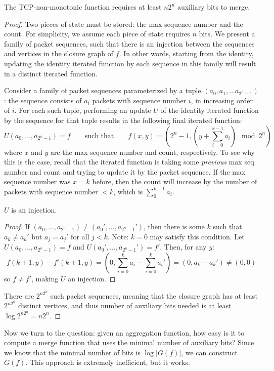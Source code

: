 \begin{theorem}
The TCP-non-monotonic function requires at least $n2^n$ auxiliary bits to merge.
\end{theorem}
\begin{proof}
Two pieces of state must be stored: the max sequence number and the count. For simplicity, we assume each piece of state requires $n$ bits.
We present a family of packet sequences, such that there is an injection between the sequences and vertices in the closure graph of $f$. In other words, starting from the identity, updating the identity iterated function by each sequence in this family will result in a distinct iterated function. 

Consider a family of packet sequences parameterized by a tuple $(a_0, a_1, \ldots a_{2^n-1})$: the sequence consists of $a_i$ packets with sequence number $i$, in increasing order of $i$. For each such tuple, performing an update $U$ of the identity iterated function by the sequence for that tuple results in the following final iterated function:
\[ U(a_0, \ldots, a_{2^n-1}) = f\quad\quad \text{such that} \quad\quad f(x,y) = \left(2^n - 1, (y + \sum_{i=0}^{x-1} a_i) \mod 2^n\right) \]
where $x$ and $y$ are the max sequence number and count, respectively. To see why this is the case, recall that the iterated function is taking some \emph{previous} max seq. number and count and trying to update it by the packet sequence. If the max sequence number was $x = k$ before, then the count will increase by the number of packets with sequence number $< k$, which is $\sum_0^{k-1} a_i$.
\begin{lemma}
$U$ is an injection.
\end{lemma}
\begin{proof}
If $(a_0, \ldots, a_{2^n-1}) \neq (a_0', \ldots, a_{2^n-1}')$, then there is some $k$ such that $a_k \neq a_k'$ but $a_j = a_j'$ for all $j < k$. Note: $k= 0$ may satisfy this condition. Let $U(a_0, \ldots, a_{2^n-1}) = f$ and $U(a_0', \ldots, a_{2^n-1}') = f'$. Then, for any $y$:
\[ f(k+1, y) - f'(k+1,y) = \left(0, \sum_{i = 0}^k a_i - \sum_{i = 0}^k a_i'\right) = (0, a_k - a_k') \neq (0, 0) \]
so $f \neq f'$, making $U$ an injection.
\end{proof}
There are $2^{n2^n}$ such packet sequences, meaning that the closure graph has at least $2^{n2^n}$ distinct vertices, and thus number of auxiliary bits needed is at least $\log 2^{n2^n} = n2^n$. 
\end{proof}

Now we turn to the question: given an aggregation function, how easy is it to compute a merge function that uses the minimal number of auxiliary bits?
Since we know that the minimal number of bits is $\log |G(f)|$, we can construct $G(f)$. This approach is extremely inefficient, but it works. 

